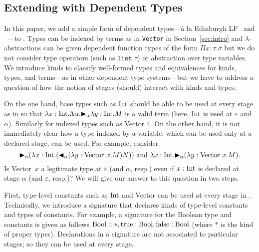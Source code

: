 \subsection{Extending \LTP with Dependent Types}


In this paper, we add a simple form of dependent types---{\`a} la Edinburgh
LF~\cite{HarperHonsellPlotkin1993Framework} and \LLF~\cite{benjamin2005attapldependent}---to \LTP.  Types can be
indexed by terms as in \texttt{Vector} in Section~\ref{sec:intro} and
\(\lambda\)-abstractions can be given dependent function types of the form
\(\Pi x:\tau. \sigma\) but we do not consider type operators (such as
$\texttt{list } \tau$) or abstraction over type variables.  We introduce kinds
to classify well-formed types and equivalences for kinds, types, and terms---as
in other dependent type systems---but we have to address a question of how the
notion of stages (should) interact with kinds and types.


On the one hand, base types such as \(\textrm{Int}\) should be able to be used at every
stage as in \LTP so that \(\lambda x:\textrm{Int}.\Lambda \alpha. {\mathop{\blacktriangleright}}_\alpha \lambda
y:\textrm{Int}.M\) is a valid term (here, \(\textrm{Int}\) is used at \(\varepsilon\) and
\(\alpha\)). Similarly for indexed types such as Vector 4. On the other hand,
it is not immediately clear how a type indexed by a variable, which can be used
only at a declared stage, can be used. For example, consider
\[{\mathop{\blacktriangleright}}_\alpha (\lambda x:\textrm{Int}. ({\mathop{\blacktriangleleft}}_\alpha (\lambda y:\text{Vector
  }x.M)N) )
  \text{ and }
  \lambda x:\textrm{Int}. {\mathop{\blacktriangleright}}_\alpha (\lambda y:\text{Vector }x.M).
\]
Is Vector\ \(x\) a legitimate type at \(\varepsilon\) (and \(\alpha\), resp.)
even if \(x:\textrm{Int}\) is declared at stage \(\alpha\) (and \(\varepsilon\), resp.)?
We will give our answer to this question in two steps.


First, type-level constants such as \(\textrm{Int}\) and Vector can be used at every
stage in \LMD. Technically, we introduce a signature that declares kinds of
type-level constants and types of constants.  For example, a signature for the
Boolean type and constants is given as follows $\textrm{Bool}::*, \text{true}:\textrm{Bool},
\text{false}:\textrm{Bool}$ (where $*$ is the kind of proper types). Declarations in a
signature are not associated to particular stages; so they can be used at every
stage.


